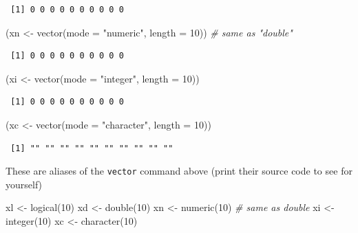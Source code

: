 \documentclass[
]{book}
\newenvironment{Shaded}{\begin{snugshade}}{\end{snugshade}}
\newcommand{\AttributeTok}[1]{\textcolor[rgb]{0.77,0.63,0.00}{#1}}
\newcommand{\CommentTok}[1]{\textcolor[rgb]{0.56,0.35,0.01}{\textit{#1}}}
\newcommand{\DecValTok}[1]{\textcolor[rgb]{0.00,0.00,0.81}{#1}}
\newcommand{\FunctionTok}[1]{\textcolor[rgb]{0.00,0.00,0.00}{#1}}
\newcommand{\NormalTok}[1]{#1}
\newcommand{\OtherTok}[1]{\textcolor[rgb]{0.56,0.35,0.01}{#1}}
\newcommand{\StringTok}[1]{\textcolor[rgb]{0.31,0.60,0.02}{#1}}
\begin{document}
\begin{verbatim}
 [1] 0 0 0 0 0 0 0 0 0 0
\end{verbatim}

\begin{Shaded}
\begin{Highlighting}[]
\NormalTok{(xn }\OtherTok{\textless{}{-}} \FunctionTok{vector}\NormalTok{(}\AttributeTok{mode =} \StringTok{"numeric"}\NormalTok{, }\AttributeTok{length =} \DecValTok{10}\NormalTok{)) }\CommentTok{\# same as "double"}
\end{Highlighting}
\end{Shaded}

\begin{verbatim}
 [1] 0 0 0 0 0 0 0 0 0 0
\end{verbatim}

\begin{Shaded}
\begin{Highlighting}[]
\NormalTok{(xi }\OtherTok{\textless{}{-}} \FunctionTok{vector}\NormalTok{(}\AttributeTok{mode =} \StringTok{"integer"}\NormalTok{, }\AttributeTok{length =} \DecValTok{10}\NormalTok{))}
\end{Highlighting}
\end{Shaded}

\begin{verbatim}
 [1] 0 0 0 0 0 0 0 0 0 0
\end{verbatim}

\begin{Shaded}
\begin{Highlighting}[]
\NormalTok{(xc }\OtherTok{\textless{}{-}} \FunctionTok{vector}\NormalTok{(}\AttributeTok{mode =} \StringTok{"character"}\NormalTok{, }\AttributeTok{length =} \DecValTok{10}\NormalTok{))}
\end{Highlighting}
\end{Shaded}

\begin{verbatim}
 [1] "" "" "" "" "" "" "" "" "" ""
\end{verbatim}

These are aliases of the \texttt{vector} command above (print their source code to see for yourself)

\begin{Shaded}
\begin{Highlighting}[]
\NormalTok{xl }\OtherTok{\textless{}{-}} \FunctionTok{logical}\NormalTok{(}\DecValTok{10}\NormalTok{)}
\NormalTok{xd }\OtherTok{\textless{}{-}} \FunctionTok{double}\NormalTok{(}\DecValTok{10}\NormalTok{)}
\NormalTok{xn }\OtherTok{\textless{}{-}} \FunctionTok{numeric}\NormalTok{(}\DecValTok{10}\NormalTok{) }\CommentTok{\# same as double}
\NormalTok{xi }\OtherTok{\textless{}{-}} \FunctionTok{integer}\NormalTok{(}\DecValTok{10}\NormalTok{)}
\NormalTok{xc }\OtherTok{\textless{}{-}} \FunctionTok{character}\NormalTok{(}\DecValTok{10}\NormalTok{)}
\end{Highlighting}
\end{Shaded}
\end{document}

